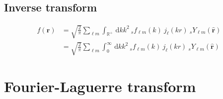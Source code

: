 \documentclass[a4paper,11pt]{article}
\newcommand{\realsnn}{\ensuremath{{\mathbb{R}^{+}}}}
\newcommand{\dx}{\ensuremath{\mathrm{\,d}}}
\newcommand{\rvec}{{\boldsymbol{r}}}
\newcommand{\rang}{{\boldsymbol{\hat{r}}}}
\newcommand{\rlen}{{r}}
\begin{document}
\subsection{Inverse transform}

\begin{align}
  f(\rvec) 
  & =  
  \sqrt{\frac{2}{\pi}} 
  \sum_{\ell m}
  \int_{\realsnn} \dx k k^2 \:
  {}_s f_{\ell m}(k) \:
  j_\ell(k\rlen) \:
  {}_s Y_{\ell m}(\rang) \\
  & =
  \sqrt{\frac{2}{\pi}} 
  \sum_{\ell m}
  \int_0^\infty \dx k k^2 \:
  {}_s f_{\ell m}(k) \:
  j_\ell(k\rlen) \:
  {}_s Y_{\ell m}(\rang) 
\end{align}



\section{Fourier-Laguerre transform}








\end{document}
